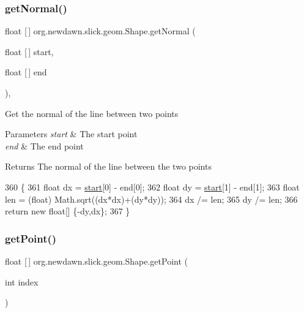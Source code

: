 \subsubsection{\texorpdfstring{get\+Normal()}{getNormal()}\hspace{0.1cm}{\footnotesize\ttfamily [2/2]}}
{\footnotesize\ttfamily float \mbox{[}$\,$\mbox{]} org.\+newdawn.\+slick.\+geom.\+Shape.\+get\+Normal (\begin{DoxyParamCaption}\item[{float \mbox{[}$\,$\mbox{]}}]{start,  }\item[{float \mbox{[}$\,$\mbox{]}}]{end }\end{DoxyParamCaption})\hspace{0.3cm}{\ttfamily [inline]}, {\ttfamily [private]}}

Get the normal of the line between two points


\begin{DoxyParams}{Parameters}
{\em start} & The start point \\
\hline
{\em end} & The end point \\
\hline
\end{DoxyParams}
\begin{DoxyReturn}{Returns}
The normal of the line between the two points 
\end{DoxyReturn}

\begin{DoxyCode}
360                                                           \{
361         \textcolor{keywordtype}{float} dx = \mbox{\hyperlink{namespaceejemplo_1_1clase_abcf43191f0ecf3b071ca2db7696ba821}{start}}[0] - end[0];
362         \textcolor{keywordtype}{float} dy = \mbox{\hyperlink{namespaceejemplo_1_1clase_abcf43191f0ecf3b071ca2db7696ba821}{start}}[1] - end[1];
363         \textcolor{keywordtype}{float} len = (float) Math.sqrt((dx*dx)+(dy*dy));
364         dx /= len;
365         dy /= len;
366         \textcolor{keywordflow}{return} \textcolor{keyword}{new} \textcolor{keywordtype}{float}[] \{-dy,dx\};
367     \}
\end{DoxyCode}
\mbox{\label{classorg_1_1newdawn_1_1slick_1_1geom_1_1_shape_a2c426ef4050ca787892205c1ec1f67af}} 
\subsubsection{\texorpdfstring{get\+Point()}{getPoint()}}
{\footnotesize\ttfamily float \mbox{[}$\,$\mbox{]} org.\+newdawn.\+slick.\+geom.\+Shape.\+get\+Point (\begin{DoxyParamCaption}\item[{int}]{index }\end{DoxyParamCaption})\hspace{0.3cm}{\ttfamily [inline]}}

